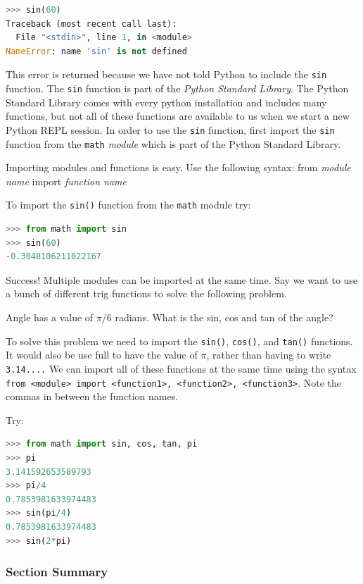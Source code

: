 \documentclass{book}
\begin{document}
\begin{lstlisting}[language=Python]
>>> sin(60)
Traceback (most recent call last):
  File "<stdin>", line 1, in <module>
NameError: name 'sin' is not defined
\end{lstlisting}

This error is returned because we have not told Python to include the
\lstinline!sin! function. The \lstinline!sin! function is part of the
\emph{Python Standard Library}. The Python Standard Library comes with
every python installation and includes many functions, but not all of
these functions are available to us when we start a new Python REPL
session. In order to use the \lstinline!sin! function, first import the
\lstinline!sin! function from the \lstinline!math! \emph{module} which
is part of the Python Standard Library.

Importing modules and functions is easy. Use the following syntax: from
\emph{module name} import \emph{function name}

To import the \lstinline!sin()! function from the \lstinline!math!
module try:

\begin{lstlisting}[language=Python]
>>> from math import sin
>>> sin(60)
-0.3048106211022167
\end{lstlisting}

Success! Multiple modules can be imported at the same time. Say we want
to use a bunch of different trig functions to solve the following
problem.

Angle has a value of \(\pi\)/6 radians. What is the sin, cos and tan of
the angle?

To solve this problem we need to import the \lstinline!sin()!,
\lstinline!cos()!, and \lstinline!tan()! functions. It would also be use
full to have the value of \(\pi\), rather than having to write
\lstinline!3.14....! We can import all of these functions at the same
time using the syntax
\lstinline!from <module> import <function1>, <function2>, <function3>!.
Note the commas in between the function names.

Try:

\begin{lstlisting}[language=Python]
>>> from math import sin, cos, tan, pi
>>> pi
3.141592653589793
>>> pi/4
0.7853981633974483
>>> sin(pi/4)
0.7853981633974483
>>> sin(2*pi)
\end{lstlisting}

    \subsubsection{Section Summary}\label{section-summary}
\end{document}
